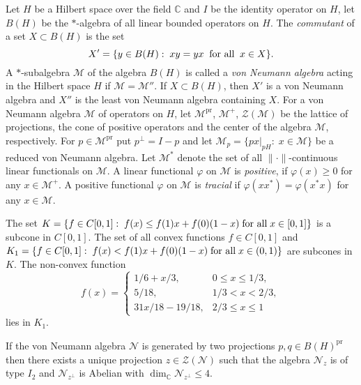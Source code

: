 \documentclass[
11pt,%
tightenlines,%
twoside,%
onecolumn,%
nofloats,%
nobibnotes,%
nofootinbib,%
superscriptaddress,%
noshowpacs,%
centertags]%
{revtex4}
\theoremstyle{definition}
\begin{document}
Let $H$ be a Hilbert space over the field $\mathbb{C}$ and $I$ be  the identity operator on $H$,
let  $B(H)$ be  the $*$-algebra of all linear bounded operators on $H$.
The {\it commutant} of a set
$X\subset B(H)$ is the set
$$
X'=\{y\in B(H) :\;  xy=yx \;\; \text{\rm  for all} \; \; x\in X\}.
$$
A $*$-subalgebra $\mathcal{M}$ of  the  algebra $B(H)$ is  called  a
{\it von   Neumann  algebra} acting  in  the  Hilbert space $H$ if
$\mathcal{M}=\mathcal{M}''$. If $X\subset B(H)$, then $X'$ is  a
von  Neumann  algebra  and $X''$ is  the  least von Neumann algebra
containing $X$.  For a von Neumann algebra $\mathcal{M}$ of
operators on $H$, let $\mathcal{M}^\mathrm{pr}$, $\mathcal{M}^+$,
$\mathcal{Z}(\mathcal{M})$ be the lattice of projections, the cone
of positive operators and the center of the algebra $\mathcal{M}$,
respectively. For $p \in \mathcal{M}^\mathrm{pr}$  put $p^\perp=I-p$
and let $\mathcal{M}_p=\{px|_{pH} :  \; x\in \mathcal{M}\}$ be a
reduced von Neumann algebra. Let $\mathcal{M}^*$ denote the set of
all $\|\cdot\|$-continuous linear functionals on $\mathcal{M}$. A
linear functional $\varphi$ on $\mathcal{M}$  is  {\it positive}, if
$\varphi(x)\geq 0$  for any $x\in \mathcal{M}^+$. A positive
functional $\varphi$ on $\mathcal{M}$ is {\it  tracial} if
$\varphi(x x^*)=\varphi(x^*x)$ for any $x\in \mathcal{M}$.

The set $K=\{f \in C[0,1]:\; f(x)\leq f(1)x+f(0)(1-x) \; \text{\rm
for all} \; x\in [0,1]\}$ is a  subcone  in  $C[0, 1]$. The set of
all  convex functions $f \in C[0,1]$  and $K_1=\{f \in C[0,1]:\;
f(x)<f(1)x+f(0)(1-x) \; \text{\rm  for all} \; x\in (0, 1)\}$
 are subcones  in $K$. The non-convex function
$$
f(x)=\begin{cases}
                     1/6+x/3,&  0\leq x \leq 1/3, \\
  5/18,&  1/3 <x < 2/3, \\
  31x/18-19/18,&  2/3\leq x \leq 1
                    \end{cases}
$$
lies in $K_1$.

\begin{lemma}\label{lemma1}
If the von Neumann algebra $\mathcal{N}$ is generated by two
projections $p, q\in B(H)^\mathrm{pr}$ then there exists a unique
projection $z\in \mathcal{Z}(\mathcal{N})$ such that the algebra
$\mathcal{N}_z$ is of type $I_2$ and $\mathcal{N}_{z^\perp}$ is
Abelian with $\dim_\mathbb{C} \mathcal{N}_{z^\perp} \leq 4$.
\end{lemma}
\end{document}
